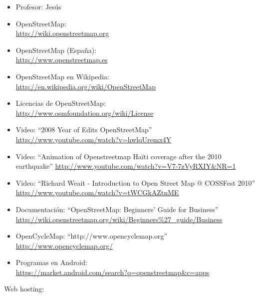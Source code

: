 \documentclass[a4paper,12pt]{article}
\begin{document}
\begin{itemize}
\item Profesor: Jesús

\item OpenStreetMap: \\
\url{http://wiki.openstreetmap.org}

\item OpenStreetMap (España): \\
\url{http://www.openstreetmap.es}

\item OpenStreetMap en Wikipedia: \\
\url{http://en.wikipedia.org/wiki/OpenStreetMap}

\item Licencias de OpenStreetMap: \\
\url{http://www.osmfoundation.org/wiki/License}

\item Video: ``2008 Year of Edits OpenStreetMap'' \\
\url{http://www.youtube.com/watch?v=hwlqUremx4Y}

\item Video: ``Animation of Openstreetmap Haïti coverage after the 2010 earthquake''
\url{http://www.youtube.com/watch?v=V7-7zVyRXIY&NR=1}

\item Video: ``Richard Weait - Introduction to Open Street Map @ COSSFest 2010'' \\
\url{http://www.youtube.com/watch?v=tWCGkAZtnME}

\item Documentación: ``OpenStreetMap: Beginners' Guide for Business'' \\
\url{http://wiki.openstreetmap.org/wiki/Beginners%27_guide/Business}

\item OpenCycleMap: ``http://www.opencyclemap.org'' \\
\url{http://www.opencyclemap.org/}

\item Programas en Android: \\
\url{https://market.android.com/search?q=openstreetmap&c=apps}

\end{itemize}

Web hosting:
\end{document}
